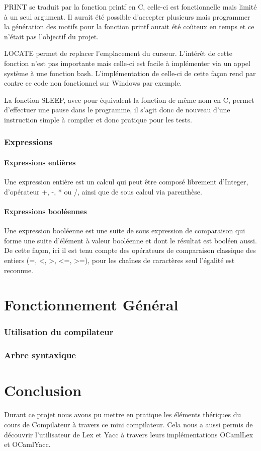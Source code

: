 \documentclass[french]{article}
\begin{document}
PRINT se traduit par la fonction printf en C, celle-ci est fonctionnelle mais limité à un seul argument. Il aurait été possible d'accepter plusieurs mais programmer la génération des motifs pour la fonction printf aurait été coûteux en temps et ce n'était pas l'objectif du projet.

LOCATE permet de replacer l'emplacement du curseur. L'intérêt de cette fonction n'est pas importante mais celle-ci est facile à implémenter via un appel système à une fonction bash. L'implémentation de celle-ci de cette façon rend par contre ce code non fonctionnel sur Windows par exemple.

La fonction SLEEP, avec pour équivalent la fonction de même nom en C, permet d'effectuer une pause dans le programme, il s'agit donc de nouveau d'une instruction simple à compiler et donc pratique pour les tests.

\section{Expressions}
\subsection{Expressions entières}
\label{ssec:expr-entiere}
Une expression entière est un calcul qui peut être composé librement d'Integer, d'opérateur +, -, * ou /, ainsi que de sous calcul via parenthèse.

\subsection{Expressions booléennes}
\label{ssec:expr-booleenne}

Une expression booléenne est une suite de sous expression de comparaison qui forme une suite d'élément à valeur booléenne et dont le résultat est booléen aussi. De cette façon, ici il est tenu compte des opérateurs de comparaison classique des entiers (=, <, >, <=, >=), pour les chaînes de caractères seul l'égalité est reconnue.

\part{Fonctionnement Général}
\section{Utilisation du compilateur}
\section{Arbre syntaxique}

\part{Conclusion}

Durant ce projet nous avons pu mettre en pratique les éléments thériques du cours de Compilateur à travers ce mini compilateur. Cela nous a aussi permis de découvrir l'utilisateur de Lex et Yacc à travers leurs implémentations OCamlLex et OCamlYacc.
\end{document}
